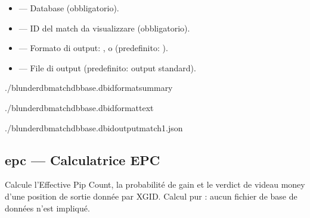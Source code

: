 \documentclass[letterpaper,10pt,italian]{sphinxmanual}
\begin{document}
\sphinxAtStartPar
{}
\begin{itemize}
\item {} 
\sphinxAtStartPar
{} — Database (obbligatorio).

\item {} 
\sphinxAtStartPar
{} — ID del match da visualizzare (obbligatorio).

\item {} 
\sphinxAtStartPar
{} — Formato di output: ,  o  (predefinito: ).

\item {} 
\sphinxAtStartPar
{} — File di output (predefinito: output standard).

\end{itemize}

\sphinxAtStartPar
{}

\begin{sphinxVerbatim}[commandchars=\\\{\}]
./blunderdbmatch\PYGZhy{}\PYGZhy{}dbbase.db\PYGZhy{}\PYGZhy{}id\PYGZhy{}\PYGZhy{}formatsummary

./blunderdbmatch\PYGZhy{}\PYGZhy{}dbbase.db\PYGZhy{}\PYGZhy{}id\PYGZhy{}\PYGZhy{}formattext

./blunderdbmatch\PYGZhy{}\PYGZhy{}dbbase.db\PYGZhy{}\PYGZhy{}id\PYGZhy{}\PYGZhy{}outputmatch1.json
\end{sphinxVerbatim}


\subsection{epc — Calculatrice EPC}
\label{\detokenize{cli:epc-calculatrice-epc}}
\sphinxAtStartPar
Calcule l’Effective Pip Count, la probabilité de gain et le verdict de videau
money d’une position de sortie donnée par XGID. Calcul pur : aucun fichier de
base de données n’est impliqué.
\end{document}
